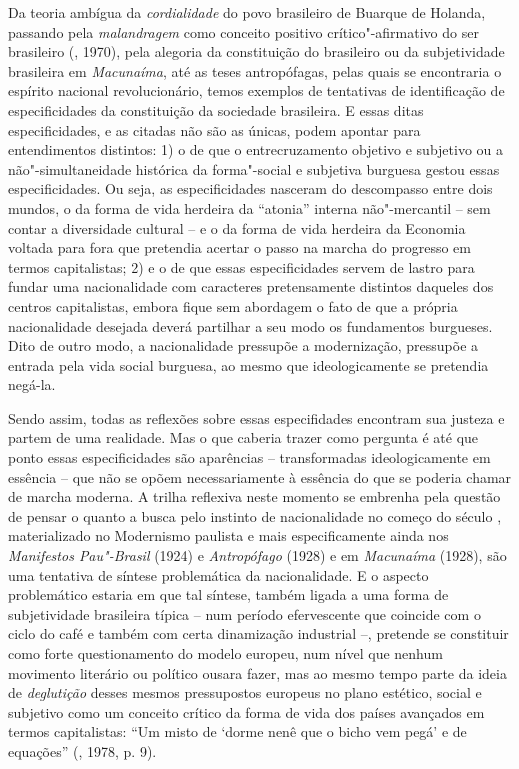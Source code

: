 {Da teoria ambígua da \emph{cordialidade} do povo brasileiro de Buarque
de Holanda, passando pela \emph{malandragem} como conceito positivo
crítico"-afirmativo do ser brasileiro (, 1970), pela alegoria da
constituição do brasileiro ou da subjetividade brasileira em
\emph{Macunaíma}, até as teses antropófagas, pelas quais se encontraria
o espírito nacional revolucionário, temos exemplos de tentativas de
identificação de especificidades da constituição da sociedade
brasileira. E essas ditas especificidades, e as citadas não são as
únicas, podem apontar para entendimentos distintos: 1) o de que o
entrecruzamento objetivo e subjetivo ou a não"-simultaneidade histórica
da forma"-social e subjetiva burguesa gestou essas especificidades. Ou
seja, as especificidades nasceram do descompasso entre dois
mundos, o da forma de vida herdeira da ``atonia'' interna não"-mercantil
-- sem contar a diversidade cultural -- e o da forma de vida herdeira da
Economia voltada para fora que pretendia acertar o passo na marcha do
progresso em termos capitalistas; 2) e o de que essas especificidades servem de
lastro para fundar uma nacionalidade com caracteres pretensamente
distintos daqueles dos centros capitalistas, embora fique sem abordagem
o fato de que a própria nacionalidade desejada deverá partilhar a seu
modo os fundamentos burgueses. Dito de outro modo, a nacionalidade
pressupõe a modernização, pressupõe a entrada pela vida social burguesa,
ao mesmo que ideologicamente se pretendia negá-la.

Sendo assim, todas as reflexões sobre essas especifidades
encontram sua justeza e partem de uma
realidade. Mas o que caberia trazer como pergunta é até que ponto essas
especificidades são aparências -- transformadas ideologicamente em
essência -- que não se opõem necessariamente à essência do que se
poderia chamar de marcha moderna. A trilha reflexiva neste momento
se embrenha pela questão de pensar o quanto a busca pelo
instinto de nacionalidade no começo do século , materializado no
Modernismo paulista e mais especificamente ainda nos \emph{Manifestos
Pau"-Brasil} (1924) e \emph{Antropófago} (1928) e em \emph{Macunaíma}
(1928), são uma tentativa de síntese problemática da nacionalidade. E o
aspecto problemático estaria em que tal síntese, também ligada a uma
forma de subjetividade brasileira típica -- num período efervescente que
coincide com o ciclo do café e também com certa dinamização industrial
--, pretende se constituir como forte questionamento do modelo europeu,
num nível que nenhum movimento literário ou político ousara fazer, mas
ao mesmo tempo parte da ideia de \emph{deglutição} desses mesmos
pressupostos europeus no plano estético, social e subjetivo como um
conceito crítico da forma de vida dos países avançados em termos
capitalistas: ``Um misto de `dorme nenê que o bicho vem pegá' e de
equações'' (, 1978, p. 9).

}
